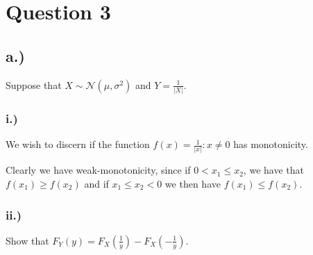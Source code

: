 
\section{Question 3} %
\label{sec:question3}

\subsection{a.)}
Suppose that $X \sim \mathcal{N}(\mu,\sigma^2)$ and $Y = \frac{1}{|X|}$.

\subsubsection{i.)}

We wish to discern if the function $f(x)= \frac{1}{|x|} : x \neq 0$ has
monotonicity.

Clearly we have weak-monotonicity, since if $0 < x_1 \leq x_2$, we have that
$f(x_1) \geq f(x_2)$ and if $x_1 \leq x_2 < 0$ we then have $f(x_1) \leq f(x_2)$.

\subsubsection{ii.)}

Show that $F_Y(y) = F_X(\frac{1}{y}) - F_X(-\frac{1}{y})$.
